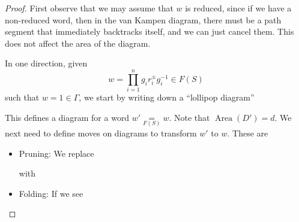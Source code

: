 \documentclass[a4paper]{article}
\DeclareMathOperator\Area{Area}
\begin{document}
\begin{proof}
  First observe that we may assume that $w$ is reduced, since if we have a non-reduced word, then in the van Kampen diagram, there must be a path segment that immediately backtracks itself, and we can just cancel them. This does not affect the area of the diagram.

  In one direction, given
  \[
    w = \prod_{i = 1}^n g_i r_i^{\pm} g_i^{-1} \in F(S)
  \]
  such that $w = 1 \in \Gamma$, we start by writing down a ``lollipop diagram''
  \begin{center}
  \end{center}
  This defines a diagram for a word $w' \underset{F(S)}{=} w$. Note that $\Area(D') = d$. We next need to define moves on diagrams to transform $w'$ to $w$. These are
  \begin{itemize}
    \item Pruning: We replace
      \begin{center}
      \end{center}
      with
      \begin{center}
      \end{center}
    \item Folding: If we see
      \begin{center}
\end{center}
\end{itemize}
\end{proof}
\end{document}
